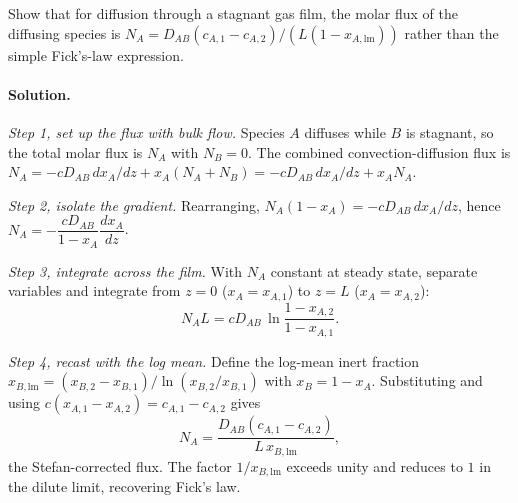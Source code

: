 \begin{exercise}
Show that for diffusion through a stagnant gas film, the molar flux
of the diffusing species is $N_A = D_{AB}(c_{A,1} - c_{A,2})/(L (1 -
x_{A,\text{lm}}))$ rather than the simple Fick's-law expression.

\paragraph{Solution.}
\textit{Step 1, set up the flux with bulk flow.} Species $A$ diffuses
while $B$ is stagnant, so the total molar flux is $N_A$ with $N_B = 0$.
The combined convection-diffusion flux is
$N_A = -c D_{AB}\,dx_A/dz + x_A(N_A + N_B) = -c D_{AB}\,dx_A/dz +
x_A N_A$.

\textit{Step 2, isolate the gradient.} Rearranging,
$N_A(1 - x_A) = -c D_{AB}\,dx_A/dz$, hence
$N_A = -\dfrac{c D_{AB}}{1-x_A}\dfrac{dx_A}{dz}$.

\textit{Step 3, integrate across the film.} With $N_A$ constant at
steady state, separate variables and integrate from $z=0$ ($x_A =
x_{A,1}$) to $z=L$ ($x_A = x_{A,2}$):
\[
N_A L = c D_{AB}\,\ln\!\frac{1-x_{A,2}}{1-x_{A,1}}.
\]

\textit{Step 4, recast with the log mean.} Define the log-mean inert
fraction $x_{B,\text{lm}} = (x_{B,2}-x_{B,1})/\ln(x_{B,2}/x_{B,1})$
with $x_B = 1 - x_A$. Substituting and using $c(x_{A,1}-x_{A,2}) =
c_{A,1}-c_{A,2}$ gives
\[
N_A = \frac{D_{AB}(c_{A,1}-c_{A,2})}{L\,x_{B,\text{lm}}},
\]
the Stefan-corrected flux. The factor $1/x_{B,\text{lm}}$ exceeds unity
and reduces to $1$ in the dilute limit, recovering Fick's law.
\end{exercise}

